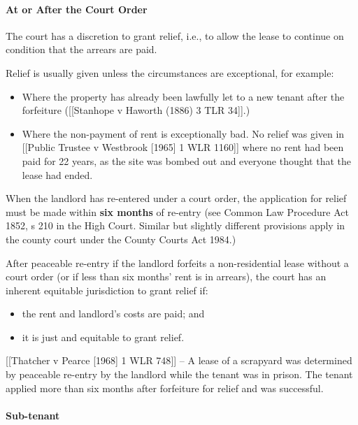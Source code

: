\documentclass[
]{article}
\providecommand{\tightlist}{%
  \setlength{\itemsep}{0pt}\setlength{\parskip}{0pt}}
\begin{document}
\hypertarget{at-or-after-the-court-order}{%
\paragraph{At or After the Court
Order}\label{at-or-after-the-court-order}}

The court has a discretion to grant relief, i.e., to allow the lease to
continue on condition that the arrears are paid.

Relief is usually given unless the circumstances are exceptional, for
example:

\begin{itemize}
\tightlist
\item
  Where the property has already been lawfully let to a new tenant after
  the forfeiture ({[}{[}Stanhope v Haworth (1886) 3 TLR 34{]}{]}.)
\item
  Where the non-payment of rent is exceptionally bad. No relief was
  given in {[}{[}Public Trustee v Westbrook {[}1965{]} 1 WLR 1160{]}{]}
  where no rent had been paid for 22 years, as the site was bombed out
  and everyone thought that the lease had ended.
\end{itemize}

When the landlord has re-entered under a court order, the application
for relief must be made within \textbf{six months} of re-entry (see
Common Law Procedure Act 1852, s 210 in the High Court. Similar but
slightly different provisions apply in the county court under the County
Courts Act 1984.)

After peaceable re-entry if the landlord forfeits a non-residential
lease without a court order (or if less than six months' rent is in
arrears), the court has an inherent equitable jurisdiction to grant
relief if:

\begin{itemize}
\tightlist
\item
  the rent and landlord's costs are paid; and
\item
  it is just and equitable to grant relief.
\end{itemize}

{[}{[}Thatcher v Pearce {[}1968{]} 1 WLR 748{]}{]} -- A lease of a
scrapyard was determined by peaceable re-entry by the landlord while the
tenant was in prison. The tenant applied more than six months after
forfeiture for relief and was successful.

\hypertarget{sub-tenant}{%
\paragraph{Sub-tenant}\label{sub-tenant}}
\end{document}
